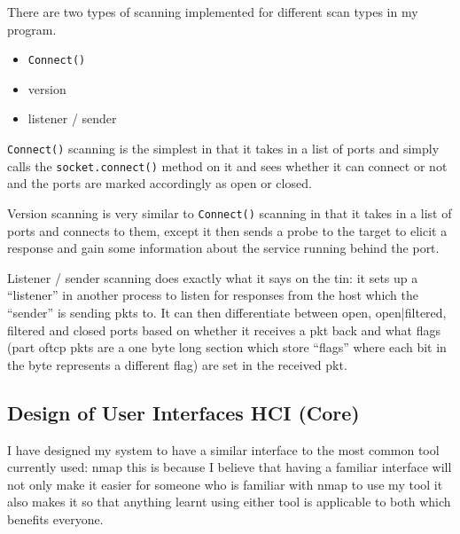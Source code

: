 \documentclass[titlepage]{article}
\let\Oldsubsection\subsection{}
\renewcommand{\subsection}{\FloatBarrier\Oldsubsection}
\begin{document}
There are two types of scanning implemented for different scan types in my program.
\begin{itemize}
  \item{\verb|Connect()|}
  \item{version}
  \item{listener / sender}
\end{itemize}
\verb|Connect()| scanning is the simplest in that it takes in a list of \glspl{port} and simply calls the
\verb|socket.connect()| method on it and sees whether it can connect or not and the \glspl{port} are
marked accordingly as open or closed.

Version scanning is very similar to \verb|Connect()| scanning in that it takes in a list of \glspl{port}
and connects to them, except it then sends a probe to the target to elicit a response and gain
some information about the service running behind the \gls{port}.

Listener / sender scanning does exactly what it says on the tin: it sets up a ``listener'' in another process
to listen for responses from the host which the ``sender'' is sending \glspl{pkt} to. It can then differentiate
between open, open|filtered, filtered and closed \glspl{port} based on whether it receives a \gls{pkt} back
and what flags (part of\gls{tcp} \glspl{pkt} are a one byte long section which store ``flags'' where each bit in the
byte represents a different flag) are set in the received \gls{pkt}.

\subsection{Design of User Interfaces HCI (Core)}

I have designed my system to have a similar interface to the most common tool currently used: nmap
this is because I believe that having a familiar interface will not only make it easier for someone who
is familiar with nmap to use my tool it also makes it so that anything learnt using either tool is applicable
to both which benefits everyone.
\end{document}
